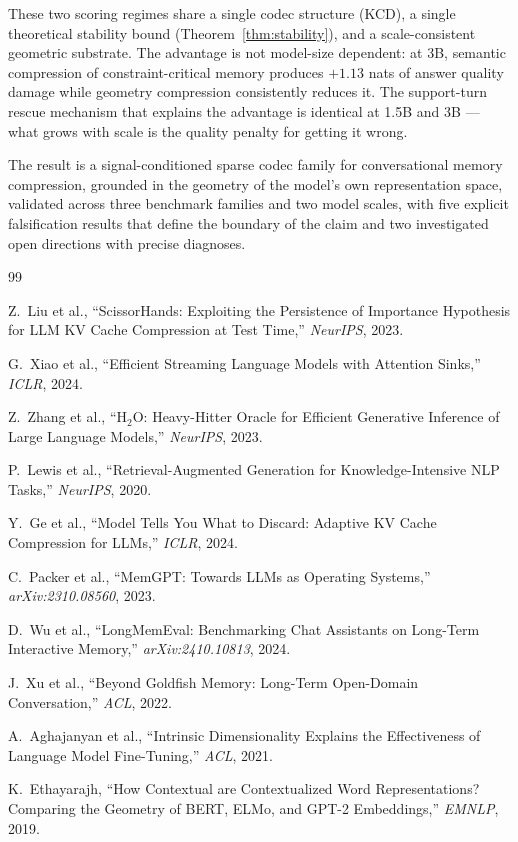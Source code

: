\documentclass[conference]{IEEEtran}
\begin{document}
These two scoring regimes share a single codec structure (KCD), a single
theoretical stability bound (Theorem~\ref{thm:stability}), and a
scale-consistent geometric substrate. The advantage is not model-size
dependent: at 3B, semantic compression of constraint-critical memory produces
$+1.13$ nats of answer quality damage while geometry compression consistently
reduces it. The support-turn rescue mechanism that explains the advantage is
identical at 1.5B and 3B --- what grows with scale is the quality penalty for
getting it wrong.

The result is a signal-conditioned sparse codec family for conversational
memory compression, grounded in the geometry of the model's own representation
space, validated across three benchmark families and two model scales, with five
explicit falsification results that define the boundary of the claim and two
investigated open directions with precise diagnoses.

\begin{thebibliography}{99}

Z.~Liu et al.,
``ScissorHands: Exploiting the Persistence of Importance Hypothesis for
LLM KV Cache Compression at Test Time,''
\emph{NeurIPS}, 2023.

G.~Xiao et al.,
``Efficient Streaming Language Models with Attention Sinks,''
\emph{ICLR}, 2024.

Z.~Zhang et al.,
``H$_2$O: Heavy-Hitter Oracle for Efficient Generative Inference of Large
Language Models,''
\emph{NeurIPS}, 2023.

P.~Lewis et al.,
``Retrieval-Augmented Generation for Knowledge-Intensive NLP Tasks,''
\emph{NeurIPS}, 2020.

Y.~Ge et al.,
``Model Tells You What to Discard: Adaptive KV Cache Compression for LLMs,''
\emph{ICLR}, 2024.

C.~Packer et al.,
``MemGPT: Towards LLMs as Operating Systems,''
\emph{arXiv:2310.08560}, 2023.

D.~Wu et al.,
``LongMemEval: Benchmarking Chat Assistants on Long-Term Interactive Memory,''
\emph{arXiv:2410.10813}, 2024.

J.~Xu et al.,
``Beyond Goldfish Memory: Long-Term Open-Domain Conversation,''
\emph{ACL}, 2022.

A.~Aghajanyan et al.,
``Intrinsic Dimensionality Explains the Effectiveness of Language Model
Fine-Tuning,''
\emph{ACL}, 2021.

K.~Ethayarajh,
``How Contextual are Contextualized Word Representations?
Comparing the Geometry of BERT, ELMo, and GPT-2 Embeddings,''
\emph{EMNLP}, 2019.

\end{thebibliography}
\end{document}
